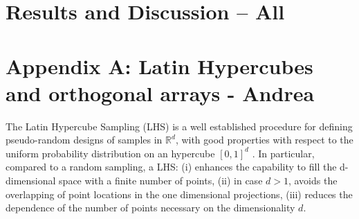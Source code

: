 \documentclass{article}
\begin{document}
%
%
%
%

\section{Results and Discussion -- All}

\section*{Appendix A: Latin Hypercubes and orthogonal arrays - Andrea}
The Latin Hypercube Sampling (LHS) is a well established procedure for defining pseudo-random designs of samples in $\mathbb R^d$, with good properties with respect to the uniform probability distribution on an hypercube $[0,1]^d$ \citep{McKay1979,Owen1992b,Stein1987,Ranjan2014,Mingyao2016}. In particular, compared to a random sampling, a LHS: (i) enhances the capability to fill the d-dimensional space with a finite number of points, (ii) in case $d>1$, avoids the overlapping of point locations in the one dimensional projections, (iii) reduces the dependence of the number of points necessary on the dimensionality $d$.
\end{document}
